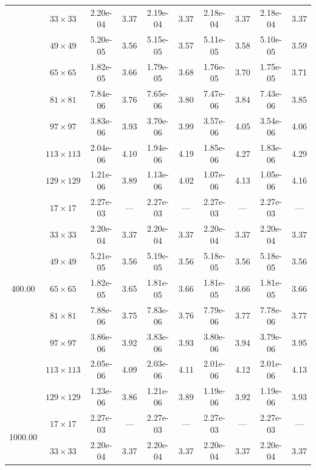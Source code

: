 \begin{table}[H]
{\begin{tabular*}{\textwidth}{@{\extracolsep\fill}c|c|cc|cc|cc|cc@{}}
                    & $33\times 33$ & 2.20e-04 & 3.37 & 2.19e-04 & 3.37 & 2.18e-04 & 3.37 & 2.18e-04 & 3.37 \\
                    & $49\times 49$ & 5.20e-05 & 3.56 & 5.15e-05 & 3.57 & 5.11e-05 & 3.58 & 5.10e-05 & 3.59 \\
                    & $65\times 65$ & 1.82e-05 & 3.66 & 1.79e-05 & 3.68 & 1.76e-05 & 3.70 & 1.75e-05 & 3.71 \\
                    & $81\times 81$ & 7.84e-06 & 3.76 & 7.65e-06 & 3.80 & 7.47e-06 & 3.84 & 7.43e-06 & 3.85 \\
                    & $97\times 97$ & 3.83e-06 & 3.93 & 3.70e-06 & 3.99 & 3.57e-06 & 4.05 & 3.54e-06 & 4.06 \\
                    & $113\times 113$ & 2.04e-06 & 4.10 & 1.94e-06 & 4.19 & 1.85e-06 & 4.27 & 1.83e-06 & 4.29 \\
                    & $129\times 129$ & 1.21e-06 & 3.89 & 1.13e-06 & 4.02 & 1.07e-06 & 4.13 & 1.05e-06 & 4.16 \\
                    \midrule
                    \multirow{7}{*}{400.00} & $17\times 17$ & 2.27e-03 & --- & 2.27e-03 & --- & 2.27e-03 & --- & 2.27e-03 & --- \\
                    & $33\times 33$ & 2.20e-04 & 3.37 & 2.20e-04 & 3.37 & 2.20e-04 & 3.37 & 2.20e-04 & 3.37 \\
                    & $49\times 49$ & 5.21e-05 & 3.56 & 5.19e-05 & 3.56 & 5.18e-05 & 3.56 & 5.18e-05 & 3.56 \\
                    & $65\times 65$ & 1.82e-05 & 3.65 & 1.81e-05 & 3.66 & 1.81e-05 & 3.66 & 1.81e-05 & 3.66 \\
                    & $81\times 81$ & 7.88e-06 & 3.75 & 7.83e-06 & 3.76 & 7.79e-06 & 3.77 & 7.78e-06 & 3.77 \\
                    & $97\times 97$ & 3.86e-06 & 3.92 & 3.83e-06 & 3.93 & 3.80e-06 & 3.94 & 3.79e-06 & 3.95 \\
                    & $113\times 113$ & 2.05e-06 & 4.09 & 2.03e-06 & 4.11 & 2.01e-06 & 4.12 & 2.01e-06 & 4.13 \\
                    & $129\times 129$ & 1.23e-06 & 3.86 & 1.21e-06 & 3.89 & 1.19e-06 & 3.92 & 1.19e-06 & 3.93 \\
                    \midrule
                    \multirow{7}{*}{1000.00} & $17\times 17$ & 2.27e-03 & --- & 2.27e-03 & --- & 2.27e-03 & --- & 2.27e-03 & --- \\
                    & $33\times 33$ & 2.20e-04 & 3.37 & 2.20e-04 & 3.37 & 2.20e-04 & 3.37 & 2.20e-04 & 3.37 \\

\end{tabular*}}
\end{table}

